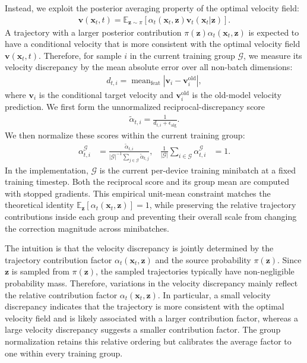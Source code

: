 \documentclass{article} %
\begin{document}
Instead, we exploit the posterior averaging property of the optimal velocity
field:
\begin{align}
\mathbf v(\mathbf{x}_t,t)
=
\mathbb{E}_{\mathbf z\sim\pi}
\left[
\alpha_t(\mathbf{x}_t,\mathbf z)
\mathbf v_t(\mathbf{x}_t|\mathbf z)
\right].
\end{align}
A trajectory
with a larger posterior contribution
$\pi(\mathbf{z})\alpha_t(\mathbf{x}_t,\mathbf z)$ is expected to have a conditional velocity
that is more consistent with the optimal velocity field
$\mathbf v(\mathbf{x}_t,t)$. Therefore, for sample $i$ in the current training
group $\mathcal G$, we measure its velocity discrepancy by the mean absolute
error over all non-batch dimensions:
\begin{align}
d_{t,i}
=
\operatorname{mean}_{\mathrm{feat}}
\left|
\mathbf v_i-
\mathbf v_i^{\mathrm{old}}
\right|,
\end{align}
where $\mathbf v_i$ is the conditional target velocity and
$\mathbf v_i^{\mathrm{old}}$ is the old-model velocity prediction. We first form
the unnormalized reciprocal-discrepancy score
\begin{align}
\tilde{\alpha}_{t,i}
=
\frac{1}{d_{t,i}+\epsilon_{\mathrm{alg}}}.
\end{align}
We then normalize these scores within the current training group:
\begin{align}
\alpha_{t,i}^{\mathcal G}
&=
\frac{
\tilde{\alpha}_{t,i}
}{
|\mathcal G|^{-1}
\sum_{j\in\mathcal G}\tilde{\alpha}_{t,j}
},
&
\frac{1}{|\mathcal G|}
\sum_{i\in\mathcal G}\alpha_{t,i}^{\mathcal G}
&=1.
\end{align}
In the implementation, $\mathcal G$ is the current per-device training
minibatch at a fixed training timestep. Both the reciprocal score and its
group mean are computed with stopped gradients. This empirical unit-mean
constraint matches the theoretical identity
$\mathbb{E}_{\mathbf z}[\alpha_t(\mathbf{x}_t,\mathbf z)]=1$, while preserving
the relative trajectory contributions inside each group and preventing their
overall scale from changing the correction magnitude across minibatches.

{\color{red}
The intuition is that the velocity discrepancy is jointly determined by the
trajectory contribution factor $\alpha_t(\mathbf{x}_t,\mathbf z)$ and the source
probability $\pi(\mathbf z)$. Since $\mathbf z$ is sampled from $\pi(\mathbf z)$,
the sampled trajectories typically have non-negligible probability mass.
Therefore, variations in the velocity discrepancy mainly reflect the relative
contribution factor $\alpha_t(\mathbf{x}_t,\mathbf z)$. In particular, a small
velocity discrepancy indicates that the trajectory is more consistent with the
optimal velocity field and is likely associated with a larger contribution
factor, whereas a large velocity discrepancy suggests a smaller contribution
factor. The group normalization retains this relative ordering but calibrates
the average factor to one within every training group.
}
\end{document}
